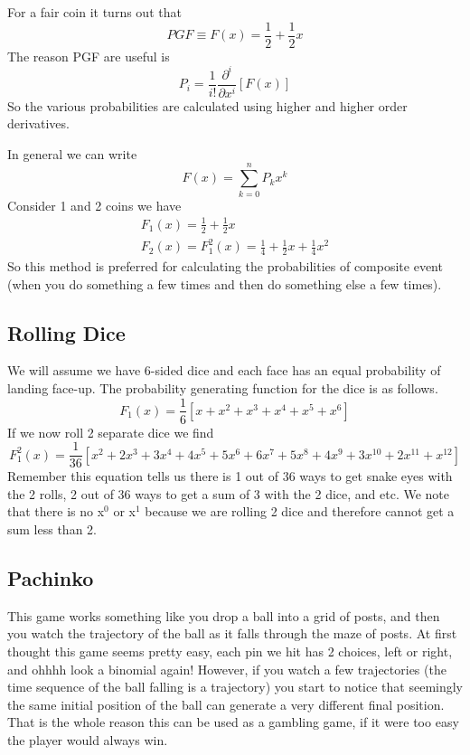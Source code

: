 \documentclass{article}
\begin{document}
For a fair coin it turns out that
\begin{equation}
PGF \equiv F(x) = \frac{1}{2} + \frac{1}{2}x
\end{equation}
The reason PGF are useful is
\begin{equation}
P_i = \frac{1}{i!}\frac{\partial^i}{\partial x^i}[F(x)]
\end{equation}
So the various probabilities are calculated using higher and higher order derivatives. 

In general we can write 
\begin{equation}
F(x) = \sum_{k=0}^n P_kx^k
\end{equation}
Consider 1 and 2 coins we have
\begin{equation}
\begin{split}
    F_1(x) = \frac{1}{2} + \frac{1}{2}x \\
    F_2(x) = F_1^2(x) = \frac{1}{4} + \frac{1}{2}x + \frac{1}{4}x^2
\end{split}
\end{equation}
So this method is preferred for calculating the probabilities of composite event (when you do something a few times and then do something else a few times). 

\subsection*{Rolling Dice}
We will assume we have 6-sided dice and each face has an equal probability of landing face-up.
The probability generating function for the dice is as follows.
\begin{equation}
F_1(x) = \frac{1}{6}[x+x^2+x^3+x^4+x^5+x^6]
\end{equation}
If we now roll 2 separate dice we find 
\begin{equation}
F_1^2(x) = \frac{1}{36}[x^2 + 2x^3 + 3x^4 + 4x^5 + 5x^6 + 6x^7 + 5x^8 + 4x^9 + 3x^{10} + 2x^{11} + x^{12} ]
\end{equation}
Remember this equation tells us there is 1 out of 36 ways to get snake eyes with the 2 rolls, 2 out of 36 ways to get a sum of 3 with the 2 dice, and etc. 
We note that there is no x$^0$ or x$^1$ because we are rolling 2 dice and therefore cannot get a sum less than 2. 

\subsection*{Pachinko}
This game works something like you drop a ball into a grid of posts, and then you watch the trajectory of the ball as it falls through the maze of posts. 
At first thought this game seems pretty easy, each pin we hit has 2 choices, left or right, and ohhhh look a binomial again!
However, if you watch a few trajectories (the time sequence of the ball falling is a trajectory) you start to notice that seemingly the same initial position of the ball can generate a very different final position. 
That is the whole reason this can be used as a gambling game, if it were too easy the player would always win.
\end{document}
